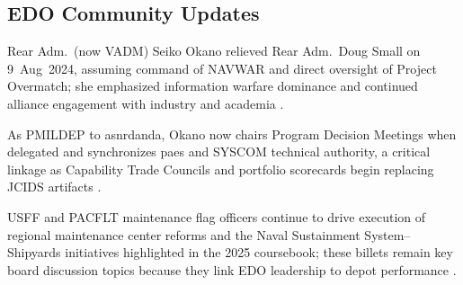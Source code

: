 \documentclass[../main.tex]{subfiles}
\begin{document}
\subsection{EDO Community Updates}
\begin{description}[style=nextline,labelsep=0.5em,font=\bfseries]
  \item[\textbf{NAVWAR change of command.}] Rear Adm.\ (now VADM) Seiko Okano relieved Rear Adm.\ Doug Small on 9~Aug~2024, assuming command of NAVWAR and direct oversight of Project Overmatch; she emphasized information warfare dominance and continued alliance engagement with industry and academia \autocite{DVIDS-Okano-2024}.
  \item[\textbf{Role of the PMILDEP.}] As PMILDEP to \ac{asnrdanda}, Okano now chairs Program Decision Meetings when delegated and synchronizes \acp{pae} and SYSCOM technical authority, a critical linkage as Capability Trade Councils and portfolio scorecards begin replacing JCIDS artifacts \autocite{SECNAV5000-2G,secwar-acq-transformation-2025}.
  \item[\textbf{Tycom maintenance focus.}] USFF and PACFLT maintenance flag officers continue to drive execution of regional maintenance center reforms and the Naval Sustainment System--Shipyards initiatives highlighted in the 2025 coursebook; these billets remain key board discussion topics because they link EDO leadership to depot performance \autocite{edo-3-3-1-acq-policy-players-2025}.
\end{description}
\end{document}
